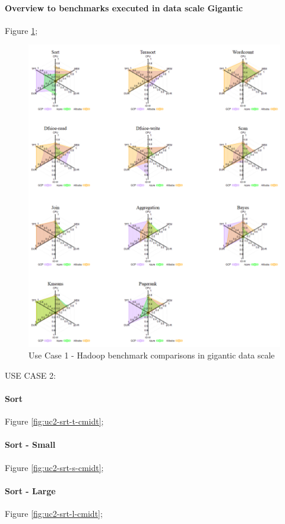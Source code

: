 \documentclass[review]{elsarticle}
\begin{document}
\paragraph{Overview to benchmarks executed in data scale Gigantic} Figure \ref{fig:uc1-gigantic}; 

\begin{figure}[p]
	\includegraphics[width=\textwidth]{uc1-gigantic}
	\caption{Use Case 1 - Hadoop benchmark comparisons in gigantic data scale}
	\label{fig:uc1-gigantic}
	\centering
\end{figure}



USE CASE 2: 


\paragraph{Sort} Figure \ref{fig:uc2-srt-t-cmidt}; 
\paragraph{Sort - Small} Figure \ref{fig:uc2-srt-s-cmidt}; 
\paragraph{Sort - Large} Figure \ref{fig:uc2-srt-l-cmidt}; 
\end{document}
